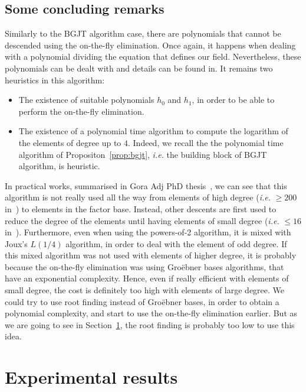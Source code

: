 \documentclass[a4paper,11pt]{article}
\theoremstyle{break}
\theoremstyle{sc}
\theoremstyle{definition}
\theoremstyle{remark}
\newcommand{\ie}{\emph{i.e. }}
\begin{document}
\subsection{Some concluding remarks}

Similarly to the BGJT algorithm case, there are polynomials that cannot be
descended using the on-the-fly elimination. Once again, it happens when
dealing with a polynomial dividing the equation that defines our field.
Nevertheless, these polynomials can be dealt with and details can be found
in\cite{GKZ14}. It remains two heuristics in this algorithm:

\begin{itemize}
  \item The existence of suitable polynomials $h_0$ and $h_1$, in order to be
    able to perform the on-the-fly elimination.
  \item The existence of a polynomial time algorithm to compute the logarithm
    of the elements of degree up to $4$. Indeed, we recall the the polynomial
    time algorithm of Propositon~\ref{prop:bgjt}, \ie the building block of
    BGJT algorithm, is heuristic.
\end{itemize}

In practical works, summarised in Gora Adj PhD thesis~\cite{Adj16}, we
    can see that this algorithm is not really used all the way from elements
    of high degree (\ie $\geq 200$ in~\cite{Adj16}) to elements in the factor base. Instead, other descents  are first used to reduce the degree of the elements
    until having elements of small degree (\ie $\leq 16$ in~\cite{Adj16}).
    Furthermore, even when using the powers-of-2 algorithm, it is mixed with
    Joux's $L(1/4)$ algorithm, in order to deal with the element of odd
    degree. If this mixed algorithm was not used with elements of higher
    degree, it is probably because the on-the-fly elimination was using
    Groëbner bases algorithms, that have an exponential complexity. Hence, even
    if really efficient with elements of small degree, the cost is definitely
    too high with elements of large degree. We could try to use root
    finding instead of Groëbner bases, in order to obtain a polynomial
    complexity, and start to use the on-the-fly elimination earlier. But as we
    are going to see in Section~\ref{sec:results}, the root finding is probably
    too low to use this idea.
\section{Experimental results}
\label{sec:results}
\end{document}
